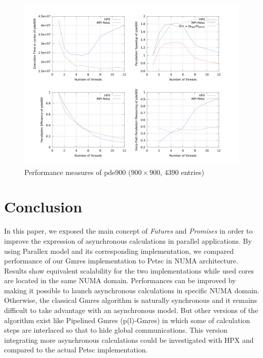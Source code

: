 \documentclass[smallextended]{svjour3}
\begin{document}
\begin{figure}[h!]
\begin{center}
\includegraphics[scale=0.25]{Images/pde900.png}
\end{center}
\caption{Performance measures of pde900 ($900\times900$, 4390 entries)}
\label{pde900}
\end{figure}

\newpage

\section{Conclusion}
In this paper, we exposed the main concept of \emph{Futures} and \emph{Promises} in order to improve the expression of asynchronous calculations in parallel applications. By using Parallex model and its corresponding implementation, we compared performance of our Gmres implementation to Petsc in NUMA architecture. Results show equivalent scalability for the two implementations while used cores are located in the same NUMA domain. Performances can be improved by making it possible to launch asynchronous calculations in specific NUMA domain. Otherwise, the classical Gmres algorithm is naturally synchronous and it remains difficult to take advantage with an asynchronous model. But other versions of the algorithm exist like Pipelined Gmres (p(l)-Gmres) \cite{Parall_GMRES} in which some of calculation steps are interlaced so that to hide global communications. This version integrating more asynchronous calculations could be investigated with HPX and compared to the actual Petsc implementation.



\end{document}
